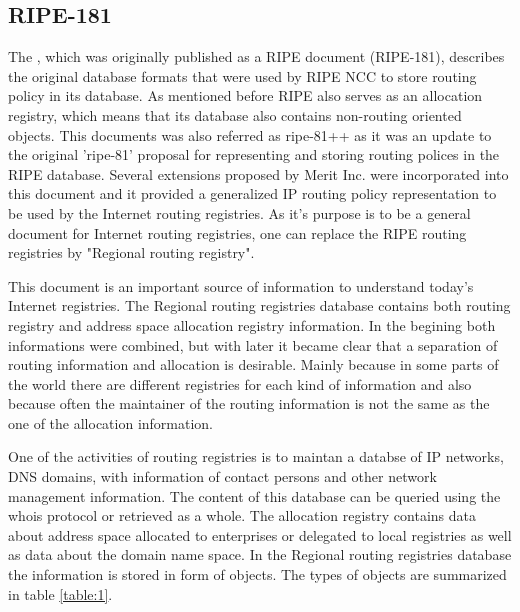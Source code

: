 \documentclass[11pt,a4paper]{scrreprt}
\begin{document}
\begin{appendices}
\chapter{RIPE-181}


The \cite{RFC_1786}, which was originally published as a RIPE document (RIPE-181), describes the original database formats that were used by RIPE NCC to store routing policy in its database. As mentioned before RIPE also serves as an allocation registry, which means that its database also contains non-routing oriented objects. 
This documents was also referred as ripe-81++ as it was an update to the original 'ripe-81' proposal for representing and storing routing polices in the RIPE database. Several extensions proposed by Merit Inc. were incorporated into this document and it provided a generalized IP routing policy representation to be used by the Internet routing registries. As it's purpose is to be a general document for Internet routing registries, one can replace the RIPE routing registries by "Regional routing registry".

This document is an important source of information to understand today's Internet registries. 
The Regional routing registries database contains both routing registry and address space allocation registry information. In the begining both informations were combined, but with later it became clear that a separation
of routing information and allocation is desirable. Mainly because in some parts of the world there are different registries for each kind of information and also because often the maintainer of the routing information is not the same as the one of the allocation information.

One of the activities of routing registries is to maintan a databse of IP networks, DNS domains, with information of contact persons and other network management information. The content of this database can be queried using the whois protocol or retrieved as a whole.
The allocation registry contains data about address space allocated to enterprises or delegated to local registries as well as data about the domain name space. 
In the Regional routing registries database the information is stored in form of objects. The types of objects are summarized in table \ref{table:1}.   
   

\end{appendices}
\end{document}
